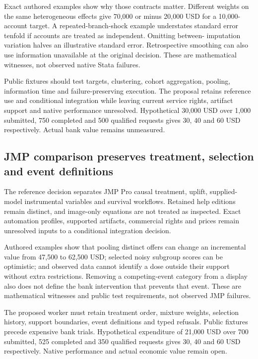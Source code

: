 Exact authored examples show why those contracts matter. Different
weights on the same heterogeneous effects give 70,000 or minus 20,000
USD for a 10,000-account target. A repeated-branch-shock example
understates standard error tenfold if accounts are treated as
independent. Omitting between- imputation variation halves an
illustrative standard error. Retrospective smoothing can also use
information unavailable at the original decision. These are mathematical
witnesses, not observed native Stata failures.
\citep{exec24_stata_choice}

Public fixtures should test targets, clustering, cohort aggregation,
pooling, information time and failure-preserving execution. The proposal
retains reference use and conditional integration while leaving current
service rights, artifact support and native performance unresolved.
Hypothetical 30,000 USD over 1,000 submitted, 750 completed and 500
qualified requests gives 30, 40 and 60 USD respectively. Actual bank
value remains unmeasured. \citep{exec24_stata_choice}

\hypertarget{jmp-comparison-preserves-treatment-selection-and-event-definitions}{%
\subsection{JMP comparison preserves treatment, selection and event
definitions}\label{jmp-comparison-preserves-treatment-selection-and-event-definitions}}

The reference decision separates JMP Pro causal treatment, uplift,
supplied- model instrumental variables and survival workflows. Retained
help editions remain distinct, and image-only equations are not treated
as inspected. Exact automation profiles, supported artifacts, commercial
rights and prices remain unresolved inputs to a conditional integration
decision. \citep{exec24_jmp_choice}

Authored examples show that pooling distinct offers can change an
incremental value from 47,500 to 62,500 USD; selected noisy subgroup
scores can be optimistic; and observed data cannot identify a dose
outside their support without extra restrictions. Removing a
competing-event category from a display also does not define the bank
intervention that prevents that event. These are mathematical witnesses
and public test requirements, not observed JMP failures.
\citep{exec24_jmp_choice}

The proposed worker must retain treatment order, mixture weights,
selection history, support boundaries, event definitions and typed
refusals. Public fixtures precede expensive bank trials. Hypothetical
expenditure of 21,000 USD over 700 submitted, 525 completed and 350
qualified requests gives 30, 40 and 60 USD respectively. Native
performance and actual economic value remain open.
\citep{exec24_jmp_choice}

